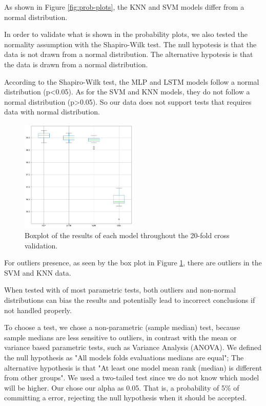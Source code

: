 As shown in Figure \ref{fig:prob-plots}, the KNN and SVM models differ from a normal distribution. 

In order to validate what is shown in the probability plots, we also tested the normality assumption with the Shapiro-Wilk test. The null hypotesis is that the data is not drawn from a normal distribution. The alternative hypotesis is that the data is drawn from a normal distribution.

According to the Shapiro-Wilk test, the MLP and LSTM models follow a normal distribution (p<0.05). As for the SVM and KNN models, they do not follow a normal distribution (p>0.05). So our data does not support tests that requires data with normal distribution.

\begin{figure}[!ht]
    \centering
    \includegraphics[width=0.5\textwidth]{img/results/boxplot.png}
    \caption{Boxplot of the results of each model throughout the 20-fold cross validation.}
    \label{fig:results-boxplot}
\end{figure}

For outliers presence, as seen by the box plot in Figure \ref{fig:results-boxplot}, there are outliers in the SVM and KNN data.

When tested with of most parametric tests, both outliers and non-normal distributions can bias the results and potentially lead to incorrect conclusions if not handled properly.

To choose a test, we chose a non-parametric (sample median) test, because sample medians are less sensitive to outliers, in contrast with the mean or variance based parametric tests, such as Variance Analysis (ANOVA).
We defined the null hypothesis as "All models folds evaluations medians are equal"; The alternative hypothesis is that "At least one model mean rank (median) is different from other groups".
We used a two-tailed test since we do not know which model will be higher.
Our chose our alpha as 0.05. That is, a probability of 5\% of committing a error, rejecting the null hypothesis when it should be accepted.

